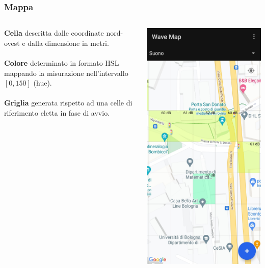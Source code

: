\documentclass{beamer}
\begin{document}
\begin{frame}
    \frametitle{Mappa}

    \begin{columns}
        \textbf{Cella} descritta dalle coordinate nord-ovest e dalla dimensione in metri.
        \\~\\
        \textbf{Colore} determinato in formato HSL mappando la misurazione nell'intervallo $[0, 150]$ (hue).
        \\~\\
        \textbf{Griglia} generata rispetto ad una celle di riferimento eletta in fase di avvio.

        \centering
        \includegraphics[width=0.90\linewidth]{./img/overview/map_zoom1.jpg}
    \end{columns} 
\end{frame}
\end{document}
